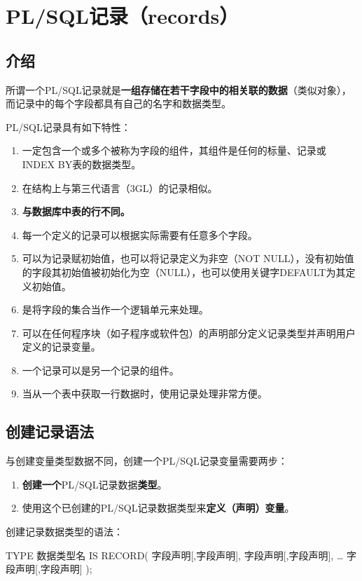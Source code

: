 \documentclass[11pt, a4paper, oneside, UTF8]{ctexbook}
\let\kaishu\relax %
\begin{document}
\section{PL/SQL记录（records）}
\subsection{介绍}
所谓一个PL/SQL记录就是{\bfseries\kaishu 一组存储在若干字段中的相关联的数据}（类似对象），而记录中的每个字段都具有自己的名字和数据类型。

PL/SQL记录具有如下特性：
\begin{enumerate}
  \item 一定包含一个或多个被称为字段的组件，其组件是任何的标量、记录或INDEX BY表的数据类型。
  \item 在结构上与第三代语言（3GL）的记录相似。
  \item {\bfseries\kaishu 与数据库中表的行不同。}
  \item 每一个定义的记录可以根据实际需要有任意多个字段。
  \item 可以为记录赋初始值，也可以将记录定义为非空（NOT NULL），没有初始值的字段其初始值被初始化为空（NULL），也可以使用关键字DEFAULT为其定义初始值。
  \item 是将字段的集合当作一个逻辑单元来处理。
  \item 可以在任何程序块（如子程序或软件包）的声明部分定义记录类型并声明用户定义的记录变量。
  \item 一个记录可以是另一个记录的组件。
  \item 当从一个表中获取一行数据时，使用记录处理非常方便。
\end{enumerate}

\subsection{创建记录语法}
与创建变量类型数据不同，创建一个PL/SQL记录变量需要两步：
\begin{enumerate}
  \item {\bfseries\kaishu 创建一个}PL/SQL记录数据{\bfseries\kaishu 类型}。
  \item 使用这个已创建的PL/SQL记录数据类型来{\bfseries\kaishu 定义（声明）变量}。
\end{enumerate}

创建记录数据类型的语法：
\begin{plsql}[caption=创建记录类型的语法]
TYPE 数据类型名 IS RECORD(
  字段声明[,字段声明],
  字段声明[,字段声明],
  …
  字段声明[,字段声明]
);
\end{plsql}
\end{document}
